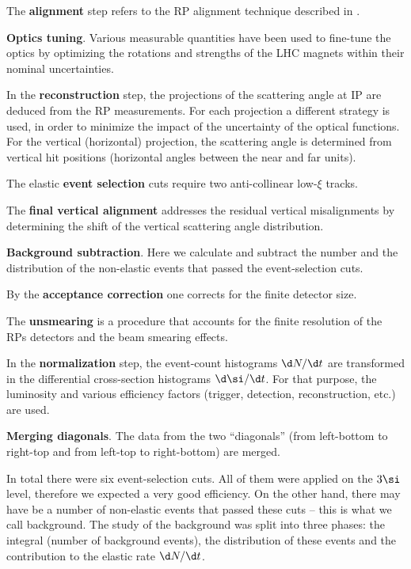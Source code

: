 \> The {\bf alignment} step refers to the RP alignment technique described in .

\> {\bf Optics tuning}. Various measurable quantities have been used to fine-tune the optics by optimizing the rotations and strengths of the LHC magnets within their nominal uncertainties.

\> In the {\bf reconstruction} step, the projections of the scattering angle at IP are deduced from the RP measurements. For each projection a different strategy is used, in order to minimize the impact of the uncertainty of the optical functions. For the vertical (horizontal) projection, the scattering angle is determined from vertical hit positions (horizontal angles between the near and far units).

\> The elastic {\bf event selection} cuts require two anti-collinear low-$\xi$ tracks.

\> The {\bf final vertical alignment} addresses the residual vertical misalignments by determining the shift of the vertical scattering angle distribution.

\> {\bf Background subtraction}. Here we calculate and subtract the number and the distribution of the non-elastic events that passed the event-selection cuts.

\> By the {\bf acceptance correction} one corrects for the finite detector size.

\> The {\bf unsmearing} is a procedure that accounts for the finite resolution of the RPs detectors and the beam smearing effects.

\> In the {\bf normalization} step, the event-count histograms $\d N/\d t$ are transformed in the differential cross-section histograms $\d\si/\d t$. For that purpose, the luminosity and various efficiency factors (trigger, detection, reconstruction, etc.) are used.

\> {\bf Merging diagonals}. The data from the two ``diagonals'' (from left-bottom to right-top and from left-top to right-bottom) are merged.

\vskip1mm

In total there were six event-selection cuts. All of them were applied on the $3\si$ level, therefore we expected a very good efficiency. On the other hand, there may have be a number of non-elastic events that passed these cuts -- this is what we call background. The study of the background was split into three phases: the integral (number of background events), the distribution of these events and the contribution to the elastic rate $\d N/\d t$.

